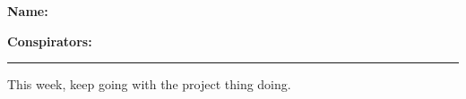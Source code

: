 \textbf{Name:} \\

\medskip

\textbf{Conspirators:} 

\medskip
\medskip

\hrule

\medskip


\assignmentsonly{\pleasesubmitprojectdraft}

This week, keep going with the project thing doing.
